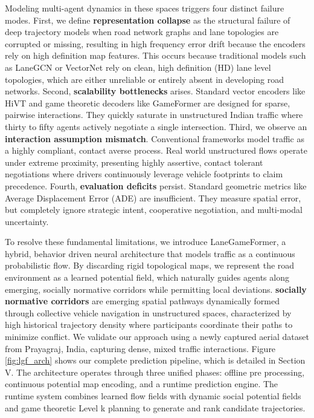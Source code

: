 \documentclass{article}
\begin{document}
Modeling multi-agent dynamics in these spaces triggers four distinct failure modes. First, we define \textbf{representation collapse} as the structural failure of deep trajectory models when road network graphs and lane topologies are corrupted or missing, resulting in high frequency error drift because the encoders rely on high definition map features. This occurs because traditional models such as LaneGCN \cite{b18} or VectorNet \cite{b16} rely on clean, high definition (HD) lane level topologies, which are either unreliable or entirely absent in developing road networks. Second, \textbf{scalability bottlenecks} arises. Standard vector encoders like HiVT \cite{b17} and game theoretic decoders like GameFormer \cite{b10} are designed for sparse, pairwise interactions. They quickly saturate in unstructured Indian traffic where thirty to fifty agents actively negotiate a single intersection. Third, we observe an \textbf{interaction assumption mismatch}. Conventional frameworks model traffic as a highly compliant, contact averse process. Real world unstructured flows operate under extreme proximity, presenting highly assertive, contact tolerant negotiations where drivers continuously leverage vehicle footprints to claim precedence. Fourth, \textbf{evaluation deficits} persist. Standard geometric metrics like Average Displacement Error (ADE) are insufficient. They measure spatial error, but completely ignore strategic intent, cooperative negotiation, and multi-modal uncertainty.

To resolve these fundamental limitations, we introduce LaneGameFormer, a hybrid, behavior driven neural architecture that models traffic as a continuous probabilistic flow. By discarding rigid topological maps, we represent the road environment as a learned potential field, which naturally guides agents along emerging, socially normative corridors while permitting local deviations. \textbf{socially normative corridors} are emerging spatial pathways dynamically formed through collective vehicle navigation in unstructured spaces, characterized by high historical trajectory density where participants coordinate their paths to minimize conflict. We validate our approach using a newly captured aerial dataset from Prayagraj, India, capturing dense, mixed traffic interactions. Figure \ref{fig:lgf_arch} shows our complete prediction pipeline, which is detailed in Section V. The architecture operates through three unified phases: offline pre processing, continuous potential map encoding, and a runtime prediction engine. The runtime system combines learned flow fields with dynamic social potential fields and game theoretic Level k planning to generate and rank candidate trajectories.
\end{document}
